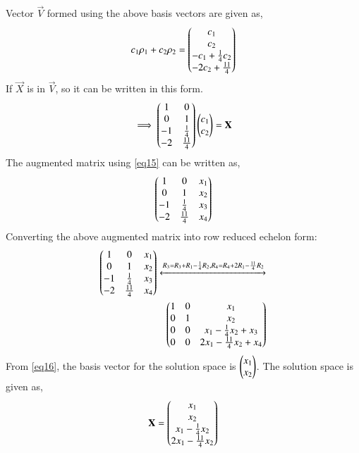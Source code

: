 \documentclass[journal,12pt,twocolumn]{IEEEtran}
\begin{document}
Vector $\vec{V}$ formed using the above basis vectors are given as,
\begin{align}
c_1\rho_1+c_2\rho_2=\begin{pmatrix}c_1\\c_2\\-c_1+\frac{1}{4}c_2\\-2c_2+\frac{11}{4}\end{pmatrix}
\end{align}
If $\vec{X}$ is in $\vec{V}$, so it can be written in this form.\\
\begin{align}
\implies \begin{pmatrix}1&0\\0&1\\-1&\frac{1}{4}\\-2&\frac{11}{4}\end{pmatrix}\begin{pmatrix}c_1\\c_2\end{pmatrix}=\mathbf{X} \label{eq15} 
\end{align}
The augmented matrix using \ref{eq15} can be written as,
\begin{align}
\begin{pmatrix}1&0&x_1\\0&1&x_2\\-1&\frac{1}{4}&x_3\\-2&\frac{11}{4}&x_4\end{pmatrix}
\end{align}
Converting the above augmented matrix into row reduced echelon form:
\begin{align}
\begin{pmatrix}1&0&x_1\\0&1&x_2\\-1&\frac{1}{4}&x_3\\-2&\frac{11}{4}&x_4\end{pmatrix}\xleftrightarrow{R_3=R_3+R_1-\frac{1}{4}R_2, R_4=R_4+2R_1-\frac{11}{4}R_2} \nonumber\\
\begin{pmatrix}1&0&x_1\\0&1&x_2\\0&0&x_1-\frac{1}{4}x_2+x_3\\0&0&2x_1-\frac{11}{4}x_2+x_4\end{pmatrix}\label{eq16}
\end{align}
From \ref{eq16}, the basis vector for the solution space is $\begin{pmatrix}x_1\\x_2\end{pmatrix}$. The solution space is given as,
\begin{align}
\mathbf{X}=\begin{pmatrix}x_1\\x_2\\x_1-\frac{1}{4}x_2\\2x_1-\frac{11}{4}x_2\end{pmatrix}
\end{align}
\end{document}
